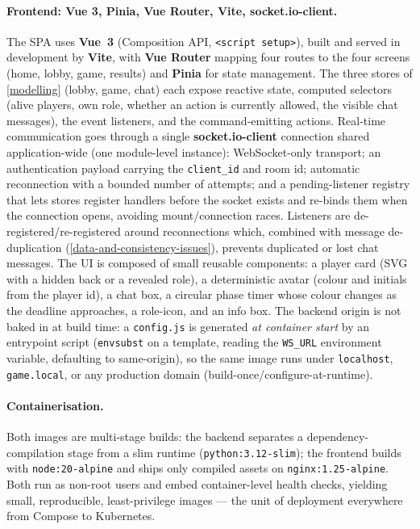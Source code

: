 \documentclass{scrartcl}
\begin{document}
\paragraph{Frontend: Vue 3, Pinia, Vue Router, Vite, socket.io-client.}
The SPA uses \textbf{Vue~3} (Composition API, \texttt{<script setup>}), built and
served in development by \textbf{Vite}, with \textbf{Vue Router} mapping four
routes to the four screens (home, lobby, game, results) and \textbf{Pinia} for
state management. The three stores of \cref{modelling} (lobby, game, chat) each
expose reactive state, computed selectors (alive players, own role, whether an
action is currently allowed, the visible chat messages), the event listeners, and
the command-emitting actions. Real-time communication goes through a single
\textbf{socket.io-client} connection shared application-wide (one module-level
instance): WebSocket-only transport; an authentication payload carrying the
\texttt{client\_id} and room id; automatic reconnection with a bounded number of
attempts; and a pending-listener registry that lets stores register handlers
before the socket exists and re-binds them when the connection opens, avoiding
mount/connection races. Listeners are de-registered/re-registered around
reconnections which, combined with message de-duplication
(\cref{data-and-consistency-issues}), prevents duplicated or lost chat messages.
The UI is composed of small reusable components: a player card (SVG with a hidden
back or a revealed role), a deterministic avatar (colour and initials from the
player id), a chat box, a circular phase timer whose colour changes as the
deadline approaches, a role-icon, and an info box. The backend origin is not
baked in at build time: a \texttt{config.js} is generated \emph{at container
      start} by an entrypoint script (\texttt{envsubst} on a template, reading the
\texttt{WS\_URL} environment variable, defaulting to same-origin), so the same
image runs under \texttt{localhost}, \texttt{game.local}, or any production
domain (build-once/configure-at-runtime).

\paragraph{Containerisation.}
Both images are multi-stage builds: the backend separates a
dependency-compilation stage from a slim runtime (\texttt{python:3.12-slim}); the
frontend builds with \texttt{node:20-alpine} and ships only compiled assets on
\texttt{nginx:1.25-alpine}. Both run as non-root users and embed container-level
health checks, yielding small, reproducible, least-privilege images --- the unit
of deployment everywhere from Compose to Kubernetes.
\end{document}
